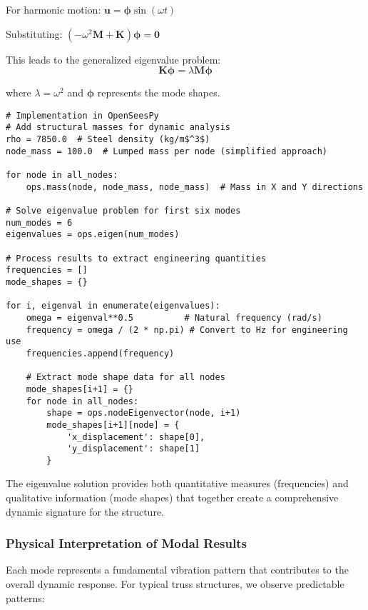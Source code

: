 \documentclass[11pt,a4paper]{article}
\begin{document}
For harmonic motion: $\mathbf{u} = \boldsymbol{\phi} \sin(\omega t)$

Substituting: $(-\omega^2\mathbf{M} + \mathbf{K})\boldsymbol{\phi} = \mathbf{0}$

This leads to the generalized eigenvalue problem:
\begin{equation}
\mathbf{K}\boldsymbol{\phi} = \lambda\mathbf{M}\boldsymbol{\phi}
\end{equation}

where $\lambda = \omega^2$ and $\boldsymbol{\phi}$ represents the mode shapes.

\begin{lstlisting}[caption={Modal Analysis Implementation in OpenSeesPy}]
# Implementation in OpenSeesPy
# Add structural masses for dynamic analysis
rho = 7850.0  # Steel density (kg/m$^3$)
node_mass = 100.0  # Lumped mass per node (simplified approach)

for node in all_nodes:
    ops.mass(node, node_mass, node_mass)  # Mass in X and Y directions

# Solve eigenvalue problem for first six modes
num_modes = 6
eigenvalues = ops.eigen(num_modes)

# Process results to extract engineering quantities
frequencies = []
mode_shapes = {}

for i, eigenval in enumerate(eigenvalues):
    omega = eigenval**0.5          # Natural frequency (rad/s)
    frequency = omega / (2 * np.pi) # Convert to Hz for engineering use
    frequencies.append(frequency)
    
    # Extract mode shape data for all nodes
    mode_shapes[i+1] = {}
    for node in all_nodes:
        shape = ops.nodeEigenvector(node, i+1)
        mode_shapes[i+1][node] = {
            'x_displacement': shape[0],
            'y_displacement': shape[1]
        }
\end{lstlisting}

The eigenvalue solution provides both quantitative measures (frequencies) and qualitative information (mode shapes) that together create a comprehensive dynamic signature for the structure.

\subsubsection{Physical Interpretation of Modal Results}

Each mode represents a fundamental vibration pattern that contributes to the overall dynamic response. For typical truss structures, we observe predictable patterns:
\end{document}
